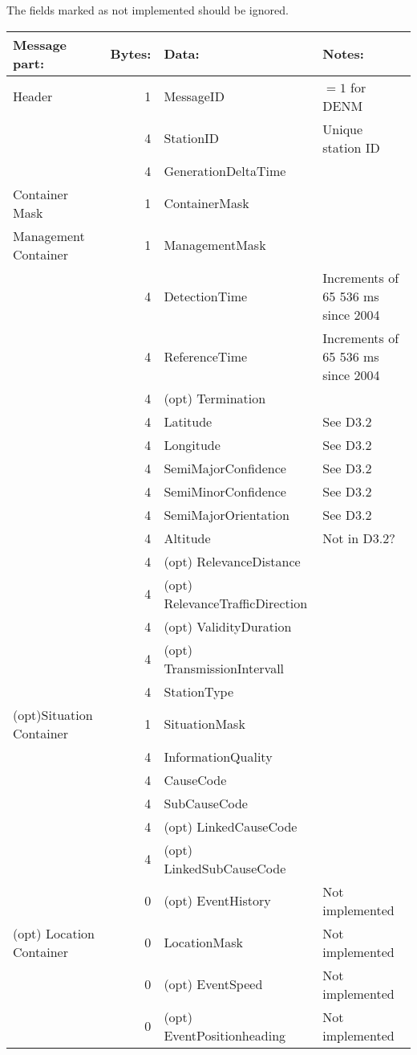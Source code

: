 \documentclass[11pt]{article}
\begin{document}
The fields marked as not implemented should be ignored.

\begin{center}
\begin{tabular}{lrll}
Message part: & Bytes: & Data: & Notes:\\
\hline
Header & 1 & MessageID & \(=1\) for DENM\\
 & 4 & StationID & Unique station ID\\
 & 4 & GenerationDeltaTime & \\
\hline
Container Mask & 1 & ContainerMask & \\
\hline
Management Container & 1 & ManagementMask & \\
 & 4 & DetectionTime & Increments of 65 536 ms since 2004\\
 & 4 & ReferenceTime & Increments of 65 536 ms since 2004\\
 & 4 & (opt) Termination & \\
 & 4 & Latitude & See D3.2\\
 & 4 & Longitude & See D3.2\\
 & 4 & SemiMajorConfidence & See D3.2\\
 & 4 & SemiMinorConfidence & See D3.2\\
 & 4 & SemiMajorOrientation & See D3.2\\
 & 4 & Altitude & Not in D3.2?\\
 & 4 & (opt) RelevanceDistance & \\
 & 4 & (opt) RelevanceTrafficDirection & \\
 & 4 & (opt) ValidityDuration & \\
 & 4 & (opt) TransmissionIntervall & \\
 & 4 & StationType & \\
\hline
(opt)Situation Container & 1 & SituationMask & \\
 & 4 & InformationQuality & \\
 & 4 & CauseCode & \\
 & 4 & SubCauseCode & \\
 & 4 & (opt) LinkedCauseCode & \\
 & 4 & (opt) LinkedSubCauseCode & \\
 & 0 & (opt) EventHistory & Not implemented\\
\hline
(opt) Location Container & 0 & LocationMask & Not implemented\\
 & 0 & (opt) EventSpeed & Not implemented\\
 & 0 & (opt) EventPositionheading & Not implemented\\

\end{tabular}
\end{center}
\end{document}
